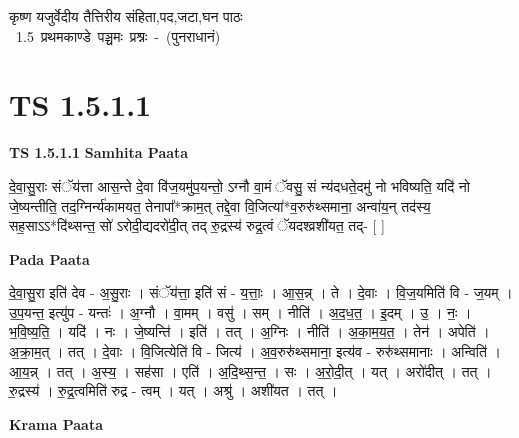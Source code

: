 \documentclass[17pt]{extarticle}
\begin{document}
\begin{titlepage}
    \begin{center}
 
\begin{sanskrit}
    { \Large
    कृष्ण यजुर्वेदीय तैत्तिरीय संहिता,पद,जटा,घन पाठः 
    }
    \\
    \vspace{2.5cm}
    \mbox{ \Large
    1.5     प्रथमकाण्डे पञ्चमः प्रश्नः - (पुनराधानं)   }
\end{sanskrit}
\end{center}

\end{titlepage}
\tableofcontents
{}
\pagebreak


\section{ TS 1.5.1.1 }

\textbf{TS 1.5.1.1 } \newline
\textbf{Samhita Paata} \newline

दे॒वा॒सु॒राः संॅय॑त्ता आस॒न्ते दे॒वा वि॑ज॒यमु॑प॒यन्तो॒ ऽग्नौ वा॒मं ॅवसु॒ सं न्य॑दधते॒दमु॑ नो भविष्यति॒ यदि॑ नो जे॒ष्यन्तीति॒ तद॒ग्निर्न्य॑कामयत॒ तेनापा᳚*क्राम॒त् तद्दे॒वा वि॒जित्या॑*व॒रुरु॑थ्समाना॒ अन्वा॑य॒न् तद॑स्य॒ सह॒साऽऽ*दि॑थ्सन्त॒ सो॑ ऽरोदी॒द्यदरो॑दी॒त् तद् रु॒द्रस्य॑ रुद्र॒त्वं ॅयदश्व्रशी॑यत॒ तद्- [ ] \newline

\textbf{Pada Paata} \newline

दे॒वा॒सु॒रा इति॑ देव - अ॒सु॒राः । संॅय॑त्ता॒ इति॑ सं - य॒त्ताः॒ । आ॒स॒न्न् । ते । दे॒वाः । वि॒ज॒यमिति॑ वि - ज॒यम् । उ॒प॒यन्त॒ इत्यु॑प - यन्तः॑ । अ॒ग्नौ । वा॒मम् । वसु॑ । सम् । नीति॑ । अ॒द॒ध॒त॒ । इ॒दम् । उ॒ । नः॒ । भ॒वि॒ष्य॒ति॒ । यदि॑ । नः । जे॒ष्यन्ति॑ । इति॑ । तत् । अ॒ग्निः । नीति॑ । अ॒का॒म॒य॒त॒ । तेन॑ । अपेति॑ । अ॒क्रा॒म॒त् । तत् । दे॒वाः । वि॒जित्येति॑ वि - जित्य॑ । अ॒व॒रुरु॑थ्समाना॒ इत्य॑व - रुरु॑थ्समानाः । अन्विति॑ । आ॒य॒न्न् । तत् । अ॒स्य॒ । सह॑सा । एति॑ । अ॒दि॒थ्स॒न्त॒ । सः । अ॒रो॒दी॒त् । यत् । अरो॑दीत् । तत् । रु॒द्रस्य॑ । रु॒द्र॒त्वमिति॑ रुद्र - त्वम् । यत् । अश्रु॑ । अशी॑यत । तत् ।  \newline


\textbf{Krama Paata} \newline
\end{document}
